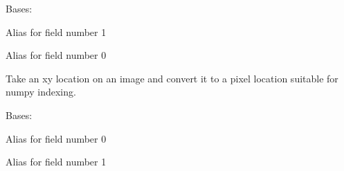 \documentclass[letterpaper,10pt,english]{sphinxmanual}
\begin{document}
\begin{fulllineitems}
\label{\detokenize{xanespy:xanespy.utilities.shape}}
Bases: 

\begin{fulllineitems}
\label{\detokenize{xanespy:xanespy.utilities.shape.columns}}
Alias for field number 1

\end{fulllineitems}


\begin{fulllineitems}
\label{\detokenize{xanespy:xanespy.utilities.shape.rows}}
Alias for field number 0

\end{fulllineitems}


\end{fulllineitems}


\begin{fulllineitems}
\label{\detokenize{xanespy:xanespy.utilities.xy_to_pixel}}
Take an xy location on an image and convert it to a pixel location
suitable for numpy indexing.

\end{fulllineitems}


\begin{fulllineitems}
\label{\detokenize{xanespy:xanespy.utilities.xycoord}}
Bases: 

\begin{fulllineitems}
\label{\detokenize{xanespy:xanespy.utilities.xycoord.x}}
Alias for field number 0

\end{fulllineitems}


\begin{fulllineitems}
\label{\detokenize{xanespy:xanespy.utilities.xycoord.y}}
Alias for field number 1

\end{fulllineitems}


\end{fulllineitems}
\end{document}
